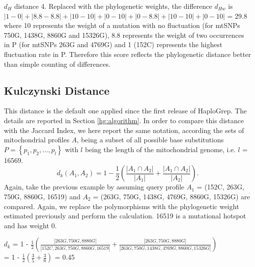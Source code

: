 $d_{H}$ distance 4. Replaced with the phylogenetic weights, the difference $d_{Hw}$ is $|1-0|+|8.8-8.8|+|10-10|+|0-10|+|0-8.8|+|10-10|+|0-10|$ = 29.8 where 10 represents the weight of a mutation with no fluctuation (for mtSNPs 750G, 1438G, 8860G and 15326G), 8.8 represents the weight of two occurrences in P (for mtSNPs 263G and 4769G) and 1 (152C) represents the highest fluctuation rate in P. Therefore this score reflects the phylogenetic distance better than simple counting of differences.

\subsection{Kulczynski Distance}
This distance is the default one applied since the first release of HaploGrep. The details are reported in Section \ref{hg:algorithm}. In order to compare this distance with the Jaccard Index, we here report the same notation, according the sets of mitochondrial profiles $A$, being a subset of all possible base substitutions $P = \left\{ p_1, p_2, ..., p_l \right\} $ with $l$ being the length of the mitochondrial genome, i.e. $l$ = 16569. 
\begin{equation}
d_k (A_1, A_2) = 1 - \frac{1}{2} \left( \frac{\left|A_1  \cap A_2\right| }{\left|A_1  \right|} + \frac{\left|A_1  \cap A_2\right| }{\left|A_2 \right| } \right).
\end{equation}
Again, take the previous example by assuming query profile $A_1$ = (152C, 263G, 750G, 8860G, 16519) and $A_2$ =  (263G, 750G, 1438G, 4769G, 8860G, 15326G) are compared. Again, we replace the polymorphisms with the phylogenetic weight estimated previously and perform the calculation. 16519 is a mutational hotspot and has weight 0.

$d_k$ = 1 - $\frac{1}{2} \left(  \frac{\left| 263G, 750G, 8880G \right|}{\left| 152C, 263G, 750G, 8860G, 16519 \right|} +\frac{\left| 263G, 750G, 8880G \right|}{\left| 263G, 750G, 1438G, 4769G, 8860G, 15326G \right|} \right)$ 
\\= 1 - $\frac{1}{2} \left(  \frac{3}{5} +\frac{3}{6} \right)$ = 0.45

